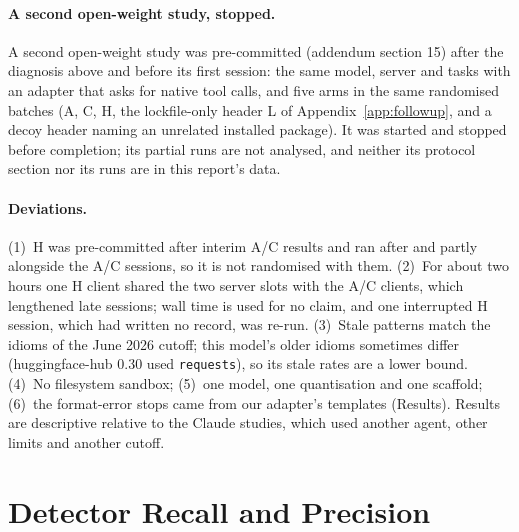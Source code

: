 \documentclass[11pt]{article}
\newcommand{\code}[1]{\texttt{#1}}
\begin{document}
\paragraph{A second open-weight study, stopped.}
A second open-weight study was pre-committed (addendum section 15) after the diagnosis above and before its first session: the same model, server and tasks with an adapter that asks for native tool calls, and five arms in the same randomised batches (A, C, H, the lockfile-only header L of Appendix~\ref{app:followup}, and a decoy header naming an unrelated installed package). It was started and stopped before completion; its partial runs are not analysed, and neither its protocol section nor its runs are in this report's data.

\paragraph{Deviations.}
(1)~H was pre-committed after interim A/C results and ran after and partly alongside the A/C sessions, so it is not randomised with them.
(2)~For about two hours one H client shared the two server slots with the A/C clients, which lengthened late sessions; wall time is used for no claim, and one interrupted H session, which had written no record, was re-run.
(3)~Stale patterns match the idioms of the June 2026 cutoff; this model's older idioms sometimes differ (huggingface-hub 0.30 used \code{requests}), so its stale rates are a lower bound.
(4)~No filesystem sandbox; (5)~one model, one quantisation and one scaffold; (6)~the format-error stops came from our adapter's templates (Results).
Results are descriptive relative to the Claude studies, which used another agent, other limits and another cutoff.

\section{Detector Recall and Precision}
\label{app:recall}
\end{document}
